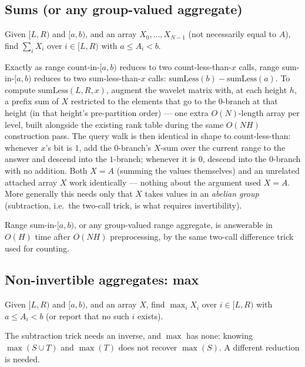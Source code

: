 \documentclass[11pt]{article}
\begin{document}
\subsection{Sums (or any group-valued aggregate)}
\begin{definitionbox}
Given $[L, R)$ and $[a, b)$, and an array $X_0, \ldots, X_{N-1}$ (not
necessarily equal to $A$), find $\sum_{i} X_i$ over $i \in [L, R)$ with
$a \le A_i < b$.
\end{definitionbox}

Exactly as range count-in-$[a,b)$ reduces to two count-less-than-$x$ calls,
range sum-in-$[a,b)$ reduces to two sum-less-than-$x$ calls:
$\mathrm{sumLess}(b) - \mathrm{sumLess}(a)$. To compute
$\mathrm{sumLess}(L, R, x)$, augment the wavelet matrix with, at each
height $h$, a prefix sum of $X$ restricted to the elements that go to the
$0$-branch at that height (in that height's pre-partition order) --- one
extra $O(N)$-length array per level, built alongside the existing rank
table during the same $O(NH)$ construction pass. The query walk is then
identical in shape to count-less-than: whenever $x$'s bit is $1$, add the
$0$-branch's $X$-sum over the current range to the answer and descend into
the $1$-branch; whenever it is $0$, descend into the $0$-branch with no
addition. Both $X = A$ (summing the values themselves) and an unrelated
attached array $X$ work identically --- nothing about the argument used
$X = A$. More generally this needs only that $X$ takes values in an
\emph{abelian group} (subtraction, i.e.\ the two-call trick, is what
requires invertibility).

\begin{theorembox}
Range sum-in-$[a,b)$, or any group-valued range aggregate, is answerable in
$O(H)$ time after $O(NH)$ preprocessing, by the same two-call
difference trick used for counting.
\end{theorembox}

\subsection{Non-invertible aggregates: max}
\begin{definitionbox}
Given $[L, R)$ and $[a, b)$, and an array $X$, find $\max_i X_i$ over
$i \in [L, R)$ with $a \le A_i < b$ (or report that no such $i$ exists).
\end{definitionbox}

The subtraction trick needs an inverse, and $\max$ has none: knowing
$\max(S \cup T)$ and $\max(T)$ does not recover $\max(S)$. A different
reduction is needed.
\end{document}
